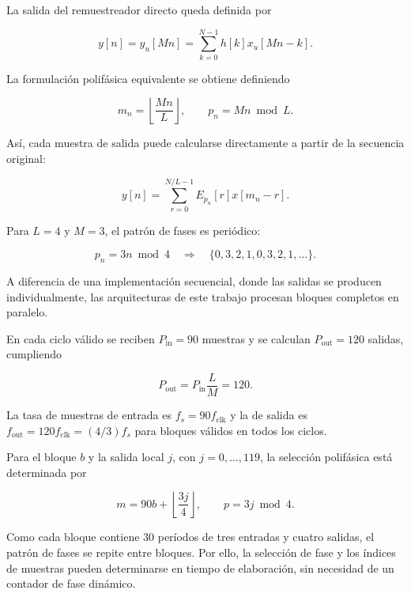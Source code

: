 \documentclass[10pt,a4paper]{article}
\begin{document}
La salida del remuestreador directo queda definida por

\begin{equation}
y[n]=y_u[Mn]
=\sum_{k=0}^{N-1}h[k]x_u[Mn-k].
\label{eq:rational-direct}
\end{equation}

La formulación polifásica equivalente se obtiene definiendo

\begin{equation}
m_n=\left\lfloor\frac{Mn}{L}\right\rfloor,
\qquad
p_n=Mn\bmod L.
\label{eq:phase-selection}
\end{equation}

Así, cada muestra de salida puede calcularse directamente a
partir de la secuencia original:

\begin{equation}
y[n]=
\sum_{r=0}^{N/L-1}E_{p_n}[r]x[m_n-r].
\label{eq:rational-polyphase}
\end{equation}

Para $L=4$ y $M=3$, el patrón de fases es periódico:

\begin{equation}
p_n=3n\bmod4
\quad\Rightarrow\quad
\{0,3,2,1,0,3,2,1,\ldots\}.
\label{eq:phase-pattern}
\end{equation}

A diferencia de una implementación secuencial, donde las salidas
se producen individualmente, las arquitecturas de este trabajo
procesan bloques completos en paralelo.

En cada ciclo válido se reciben $P_{\mathrm{in}}=90$ muestras y
se calculan $P_{\mathrm{out}}=120$ salidas, cumpliendo

\begin{equation}
P_{\mathrm{out}}=
P_{\mathrm{in}}\frac{L}{M}=120.
\label{eq:parallelism}
\end{equation}

La tasa de muestras de entrada es $f_s=90f_{\mathrm{clk}}$ y la de salida es
$f_{\mathrm{out}}=120f_{\mathrm{clk}}=(4/3)f_s$ para bloques válidos en todos
los ciclos.

Para el bloque $b$ y la salida local $j$, con
$j=0,\ldots,119$, la selección polifásica está determinada por

\begin{equation}
m=90b+\left\lfloor\frac{3j}{4}\right\rfloor,
\qquad
p=3j\bmod4.
\label{eq:block-indexing}
\end{equation}

Como cada bloque contiene 30 períodos de tres entradas y cuatro
salidas, el patrón de fases se repite entre bloques. Por ello,
la selección de fase y los índices de muestras pueden determinarse
en tiempo de elaboración, sin necesidad de un contador de fase
dinámico.
\end{document}

